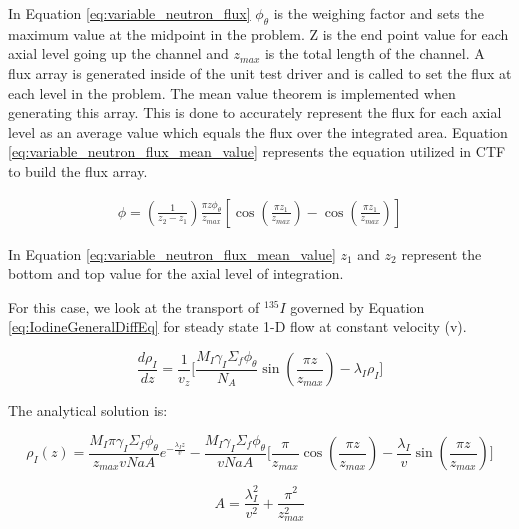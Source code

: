 \newpage



In Equation \ref{eq:variable_neutron_flux} $\phi_{\theta}$ is the weighing factor and sets the maximum value at the 
midpoint in the problem. Z is the end point value for each axial level going up the channel and $z_{max}$ is the total 
length of the channel. A flux array is generated inside of the unit test driver and is called to set the flux at each level in 
the problem. The mean value theorem is implemented when generating this array. This is done to accurately represent 
the flux for each axial level as an average value which equals the flux over the integrated area. Equation 
\ref{eq:variable_neutron_flux_mean_value} represents the equation utilized in CTF to build the flux array. 

\begin{align}
   \phi = \left(\frac{1}{z_{2} - z_{1}}\right)\frac{\pi z \phi_{\theta}}{z_{max}}\left[\cos\left(\frac{\pi z_{1}}{z_{max}}\right) - \cos\left(\frac{\pi z_{1}}{z_{max}}\right)\right]
\label{eq:variable_neutron_flux_mean_value}
\end{align}

In Equation \ref{eq:variable_neutron_flux_mean_value} $z_{1}$ and $z_{2}$ represent the bottom and top value for the 
axial level of integration. 

For this case, we look at the transport of ${}^{135}I$ governed by Equation \ref{eq:IodineGeneralDiffEq} for steady state 1-D flow at constant velocity (v).

\begin{equation}
    \frac{d\rho_{I}}{dz} = \frac{1}{v_{z}}\bigg[\frac{M_{I}\gamma_{I}\Sigma_{f}\phi_{\theta}}{N_{A}}\sin\left(\frac{\pi z}{z_{max}}\right) - \lambda_{I}\rho_{I}\bigg]
    \label{eq:Iodine1D}
\end{equation}

The analytical solution is:

\begin{equation}
    \rho_{I}(z) = \frac{M_{I}\pi\gamma_{I}\Sigma_{f}\phi_{\theta}}{z_{max} v Na  A}e^{-\frac{\lambda_{I}z}{v}} - \frac{M_{I}\gamma_{I}\Sigma_{f}\phi_{\theta}}{ v Na  A}\bigg[ \frac{\pi}{z_{max}}\cos{\left(\frac{\pi z}{z_{max}}\right)}-\frac{\lambda_{I}}{v}\sin{\left(\frac{\pi z}{z_{max}}\right)}\bigg]
\end{equation}

\begin{equation*}
    A = \frac{\lambda_{I}^{2}}{v^{2}} + \frac{\pi^{2}}{z_{max}^{2}}
\end{equation*}

